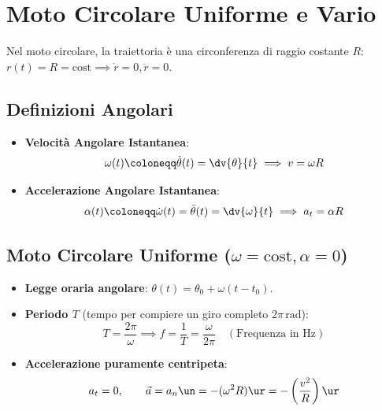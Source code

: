 \section{Moto Circolare Uniforme e Vario}
\label{sec:moto_circolare}

Nel moto circolare, la traiettoria è una circonferenza di raggio costante $R$: $r(t) = R = \text{cost} \implies \dot{r} = 0, \ddot{r} = 0$.

\subsection{Definizioni Angolari}
\begin{itemize}
    \item \textbf{Velocità Angolare Istantanea}:
    \begin{equation}
        \omega(t) \coloneqq \dot{\theta}(t) = \dv{\theta}{t} \implies v = \omega R
    \end{equation}
    \item \textbf{Accelerazione Angolare Istantanea}:
    \begin{equation}
        \alpha(t) \coloneqq \dot{\omega}(t) = \ddot{\theta}(t) = \dv{\omega}{t} \implies a_t = \alpha R
    \end{equation}
\end{itemize}

\subsection{Moto Circolare Uniforme ($\omega = \text{cost}, \alpha = 0$)}
\begin{itemize}
    \item \textbf{Legge oraria angolare}: $\theta(t) = \theta_0 + \omega(t - t_0)$.
    \item \textbf{Periodo $T$} (tempo per compiere un giro completo $2\pi\,\si{\radian}$):
    \begin{equation}
        T = \frac{2\pi}{\omega} \implies f = \frac{1}{T} = \frac{\omega}{2\pi} \quad (\text{Frequenza in }\si{\hertz})
    \end{equation}
    \item \textbf{Accelerazione puramente centripeta}:
    \begin{equation}
        a_t = 0, \qquad \vec{a} = a_n \un = -(\omega^2 R)\ur = -\left(\frac{v^2}{R}\right)\ur
    \end{equation}
\end{itemize}

